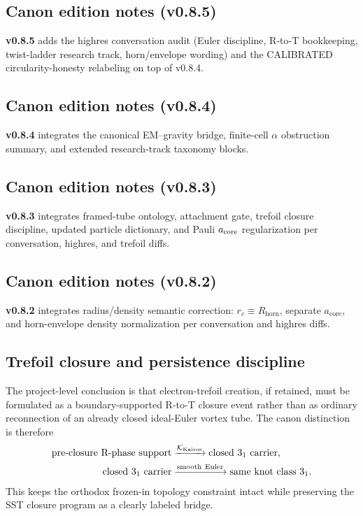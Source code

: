 \documentclass[11pt]{article}
\theoremstyle{definition}
\theoremstyle{plain}
\theoremstyle{remark}
\newcommand{\rc}{{r_c}}
\begin{document}
        \subsection{Canon edition notes (v0.8.5)}
            \textbf{v0.8.5} adds the highres conversation audit (Euler discipline, R-to-T bookkeeping, twist-ladder research track, horn/envelope wording) and the CALIBRATED circularity-honesty relabeling on top of v0.8.4.

        \subsection{Canon edition notes (v0.8.4)}
            \textbf{v0.8.4} integrates the canonical EM--gravity bridge, finite-cell $\alpha$ obstruction summary, and extended research-track taxonomy blocks.

        \subsection{Canon edition notes (v0.8.3)}
            \textbf{v0.8.3} integrates framed-tube ontology, attachment gate, trefoil closure discipline, updated particle dictionary, and Pauli $a_{\rm core}$ regularization per conversation, highres, and trefoil diffs.

        \subsection{Canon edition notes (v0.8.2)}
            \textbf{v0.8.2} integrates radius/density semantic correction: $\rc \equiv R_{\mathrm{horn}}$, separate $a_{\mathrm{core}}$, and horn-envelope density normalization per conversation and highres diffs.


        \subsection{Trefoil closure and persistence discipline}
            The project-level conclusion is that electron-trefoil creation, if
            retained, must be formulated as a boundary-supported R-to-T closure
            event rather than as ordinary reconnection of an already closed
            ideal-Euler vortex tube. The canon distinction is therefore
            \begin{align}
                \text{pre-closure R-phase support}
                &\xrightarrow{\mathcal{K}_{\rm Kairos}}
                \text{closed }3_1\text{ carrier},\\
                \text{closed }3_1\text{ carrier}
                &\xrightarrow{\rm smooth\ Euler}
                \text{same knot class }3_1 .
            \end{align}
            This keeps the orthodox frozen-in topology constraint intact while
            preserving the SST closure program as a clearly labeled bridge.
\end{document}

